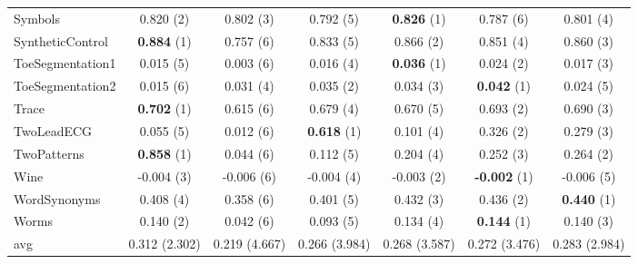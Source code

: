 \begin{table}[ht]
\begin{adjustbox}{width=\textwidth}
\begin{tabular}{lcccccc}
    Symbols & 0.820 (2) & 0.802 (3) & 0.792 (5) & \textbf{0.826} (1) & 0.787 (6) & 0.801 (4) \\
    SyntheticControl & \textbf{0.884} (1) & 0.757 (6) & 0.833 (5) & 0.866 (2) & 0.851 (4) & 0.860 (3) \\
    ToeSegmentation1 & 0.015 (5) & 0.003 (6) & 0.016 (4) & \textbf{0.036} (1) & 0.024 (2) & 0.017 (3) \\
    ToeSegmentation2 & 0.015 (6) & 0.031 (4) & 0.035 (2) & 0.034 (3) & \textbf{0.042} (1) & 0.024 (5) \\
    Trace & \textbf{0.702} (1) & 0.615 (6) & 0.679 (4) & 0.670 (5) & 0.693 (2) & 0.690 (3) \\
    TwoLeadECG & 0.055 (5) & 0.012 (6) & \textbf{0.618} (1) & 0.101 (4) & 0.326 (2) & 0.279 (3) \\
    TwoPatterns & \textbf{0.858} (1) & 0.044 (6) & 0.112 (5) & 0.204 (4) & 0.252 (3) & 0.264 (2) \\
    Wine & -0.004 (3) & -0.006 (6) & -0.004 (4) & -0.003 (2) & \textbf{-0.002} (1) & -0.006 (5) \\
    WordSynonyms & 0.408 (4) & 0.358 (6) & 0.401 (5) & 0.432 (3) & 0.436 (2) & \textbf{0.440} (1) \\
    Worms & 0.140 (2) & 0.042 (6) & 0.093 (5) & 0.134 (4) & \textbf{0.144} (1) & 0.140 (3) \\
    \hline 
    avg & 0.312 (2.302) & 0.219 (4.667) & 0.266 (3.984) & 0.268 (3.587) & 0.272 (3.476) & 0.283 (2.984) \\ 
    \hline
    \end{tabular}
    \end{adjustbox}
    \end{table}
    
    
    
